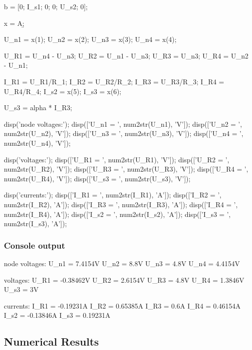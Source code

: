 {\begin{matlabcode}
b = [0; I_s1; 0; 0; U_s2; 0];

x = A\b;

U_n1 = x(1);
U_n2 = x(2);
U_n3 = x(3);
U_n4 = x(4);

U_R1 = U_n4 - U_n3;
U_R2 = U_n1 - U_n3;
U_R3 = U_n3;
U_R4 = U_n2 - U_n1;

I_R1 = U_R1/R_1;
I_R2 = U_R2/R_2;
I_R3 = U_R3/R_3;
I_R4 = U_R4/R_4;
I_s2 = x(5);
I_s3 = x(6);

U_s3 = alpha * I_R3;
\end{matlabcode}
\begin{matlabcode}
   disp('node voltages:');
   disp(['U_n1 = ', num2str(U_n1), 'V']);
   disp(['U_n2 = ', num2str(U_n2), 'V']);
   disp(['U_n3 = ', num2str(U_n3), 'V']);
   disp(['U_n4 = ', num2str(U_n4), 'V']);
\end{matlabcode}

\begin{matlabcode}
   disp('voltages:');
   disp(['U_R1 = ', num2str(U_R1), 'V']);
   disp(['U_R2 = ', num2str(U_R2), 'V']);
   disp(['U_R3 = ', num2str(U_R3), 'V']);
   disp(['U_R4 = ', num2str(U_R4), 'V']);
   disp(['U_s3 = ', num2str(U_s3), 'V']);
\end{matlabcode}

\begin{matlabcode}
   disp('currents:');
   disp(['I_R1 = ', num2str(I_R1), 'A']);
   disp(['I_R2 = ', num2str(I_R2), 'A']);
   disp(['I_R3 = ', num2str(I_R3), 'A']);
   disp(['I_R4 = ', num2str(I_R4), 'A']);
   disp(['I_s2 = ', num2str(I_s2), 'A']);
   disp(['I_s3 = ', num2str(I_s3), 'A']);
\end{matlabcode}
   
\subsubsection{Console output}
\begin{matlaboutput}
node voltages:
U_n1 = 7.4154V
U_n2 = 8.8V
U_n3 = 4.8V
U_n4 = 4.4154V

voltages:
U_R1 = -0.38462V
U_R2 = 2.6154V
U_R3 = 4.8V
U_R4 = 1.3846V
U_s3 = 3V

currents:
I_R1 = -0.19231A
I_R2 = 0.65385A
I_R3 = 0.6A
I_R4 = 0.46154A
I_s2 = -0.13846A
I_s3 = 0.19231A
\end{matlaboutput}

\subsection{Numerical Results}
}
